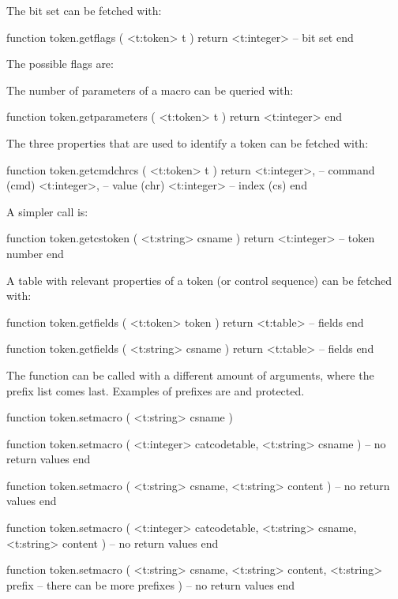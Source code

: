 The bit set can be fetched with:

\starttyping[option=LUA]
function token.getflags ( <t:token> t )
    return <t:integer> -- bit set
end
\stoptyping

The possible flags are:

\startthreerows
{}
\stopthreerows

The number of parameters of a macro can be queried with:

\starttyping[option=LUA]
function token.getparameters ( <t:token> t )
    return <t:integer>
end
\stoptyping

The three properties that are used to identify a token can be fetched with:

\starttyping[option=LUA]
function token.getcmdchrcs ( <t:token> t )
    return
        <t:integer>, -- command (cmd)
        <t:integer>, -- value   (chr)
        <t:integer>  -- index   (cs)
end
\stoptyping

A simpler call is:

\starttyping[option=LUA]
function token.getcstoken ( <t:string> csname )
    return <t:integer> -- token number
end
\stoptyping

A table with relevant properties of a token (or control sequence) can be fetched
with:

\starttyping[option=LUA]
function token.getfields ( <t:token> token )
    return <t:table> -- fields
end

function token.getfields ( <t:string> csname )
    return <t:table> -- fields
end
\stoptyping

\stopsubsection

\startsubsection[title={Setters}]

The  function can be called with a different amount of arguments,
where the prefix list comes last. Examples of prefixes are  and \type
{protected}.

\starttyping[option=LUA]
function token.setmacro (
    <t:string> csname
)

function token.setmacro (
    <t:integer> catcodetable,
    <t:string>  csname
)
    -- no return values
end

function token.setmacro (
    <t:string> csname,
    <t:string> content
)
    -- no return values
end

function token.setmacro (
    <t:integer> catcodetable,
    <t:string>  csname,
    <t:string>  content
)
    -- no return values
end

function token.setmacro (
    <t:string> csname,
    <t:string> content,
    <t:string> prefix
 -- there can be more prefixes
)
    -- no return values
end


